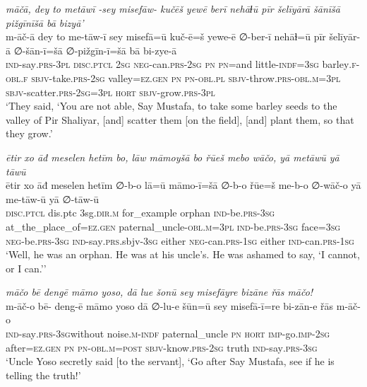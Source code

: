 \ea \label{ŽP.27}
\textit{māčā, dey to metāwī -sey misefāw- kučēš yewē berī nehāɫū pīr šelīyārā šānīšā pižgīnīšā bā bizyā’} \\ 
\gll m-āč-ā dey to me-tāw-ī sey misefā=ū kuč-ē=š yewe-ē ∅-ber-ī nehāɫ=ū pīr šelīyār-ā ∅-šān-ī=šā ∅-pižgīn-ī=šā bā bi-zye-ā \\ 
 \textsc{ind-}say\textsc{.prs}\textsc{-3pl} \textsc{disc.ptcl} \textsc{2sg} \textsc{neg-}can\textsc{.prs}-\textsc{2sg} \textsc{pn} \textsc{pn}=and little\textsc{-indf}\textsc{=3sg} barley\textsc{.f}\textsc{-obl}\textsc{.f} \textsc{sbjv-}take\textsc{.prs}-\textsc{2sg} valley\textsc{\textsc{=ez.gen}} \textsc{pn} \textsc{pn}\textsc{-obl}\textsc{.pl} \textsc{sbjv-}throw\textsc{.prs}\textsc{-obl}\textsc{.m}\textsc{=3pl} \textsc{sbjv-}scatter\textsc{.prs}-\textsc{2sg}\textsc{=3pl} \textsc{hort} \textsc{sbjv-}grow\textsc{.prs}\textsc{-3pl} \\ 
\glt `They said, ‘You are not able, Say Mustafa, to take some barley seeds to the valley of Pir Shaliyar, [and] scatter them [on the field], [and] plant them, so that they grow.'
\z 
 
\ea \label{ŽP.28}
\textit{ētir xo āđ meselen hetīm bo, lāw māmoyšā bo řūeš mebo wāčo, yā metāwū yā tāwū} \\ 
\gll ētir xo āđ meselen hetīm ∅-b-o lā=ū māmo-ī=šā ∅-b-o řūe=š me-b-o ∅-wāč-o yā me-tāw-ū yā ∅-tāw-ū \\ 
 \textsc{disc.ptcl} dis.ptc 3sg\textsc{.dir}\textsc{.m} for\_example orphan \textsc{ind-}be\textsc{.prs}\textsc{-3sg} at\_the\_place\_of\textsc{\textsc{=ez.gen}} paternal\_uncle\textsc{-obl}\textsc{.m}\textsc{=3pl} \textsc{ind-}be\textsc{.prs}\textsc{-3sg} face\textsc{=3sg} \textsc{neg-}be\textsc{.prs}\textsc{-3sg} \textsc{ind-}say\textsc{.prs}.sbjv\textsc{-3sg} either \textsc{neg-}can\textsc{.prs}\textsc{-\textsc{1sg}} either \textsc{ind-}can\textsc{.prs}\textsc{-\textsc{1sg}} \\ 
\glt `Well, he was an orphan. He was at his uncle’s. He was ashamed to say, ‘I cannot, or I can.’'
\z 
 
\ea \label{ŽP.43}
\textit{māčo bē dengē māmo yoso, dā lue šonū sey misefāyre bizāne řās māčo!} \\ 
\gll m-āč-o bē- deng-ē māmo yoso dā ∅-lu-e šūn=ū sey misefā-ī=re bi-zān-e řās m-āč-o \\ 
 \textsc{ind-}say\textsc{.prs}\textsc{-3sg}without noise\textsc{.m}\textsc{-indf} paternal\_uncle \textsc{pn} \textsc{hort} \textsc{imp-}go.\textsc{imp-}\textsc{2sg} after\textsc{\textsc{=ez.gen}} \textsc{pn} \textsc{pn}\textsc{-obl}\textsc{.m}\textsc{=\textsc{post}} \textsc{sbjv-}know\textsc{.prs}-\textsc{2sg} truth \textsc{ind-}say\textsc{.prs}\textsc{-3sg} \\ 
\glt `Uncle Yoso secretly said [to the servant], ‘Go after Say Mustafa, see if he is telling the truth!'
\z 
 
